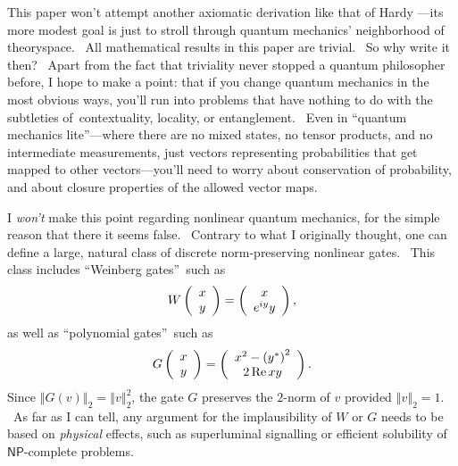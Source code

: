 \documentclass[12pt]{article}%
\begin{document}
This paper won't attempt another axiomatic derivation like that of
Hardy \cite{hardy}---its more modest goal is just to stroll through quantum
mechanics' neighborhood of theoryspace. \ All mathematical results in this
paper are trivial. \ So why write it then? \ Apart from the fact that
triviality never stopped a quantum philosopher before, I hope to make a point:
that if you change quantum mechanics in the most obvious ways, you'll run into
problems that have nothing to do with the subtleties of\ contextuality,
locality, or entanglement. \ Even in \textquotedblleft quantum mechanics
lite\textquotedblright---where there are no mixed states, no tensor products,
and no intermediate measurements, just vectors representing probabilities that
get mapped to other vectors---you'll need to worry about conservation of
probability, and about closure properties of the allowed vector maps.

I \textit{won't} make this point regarding nonlinear quantum mechanics, for
the simple reason that there it seems false. \ Contrary to what I originally
thought, one can define a large, natural class of discrete norm-preserving
nonlinear gates. \ This class includes \textquotedblleft Weinberg
gates\textquotedblright\ such as%
\[
W\left(
\begin{array}
[c]{c}%
x\\
y
\end{array}
\right)  =\left(
\begin{array}
[c]{c}%
x\\
e^{iy}y
\end{array}
\right)  ,
\]
as well as \textquotedblleft polynomial gates\textquotedblright\ such as%
\[
G\left(
\begin{array}
[c]{c}%
x\\
y
\end{array}
\right)  =\left(
\begin{array}
[c]{c}%
x^{2}-\left(  y^{\ast}\right)  ^{2}\\
2\operatorname{Re}xy
\end{array}
\right)  .
\]
Since $\left\Vert G\left(  v\right)  \right\Vert _{2}=\left\Vert v\right\Vert
_{2}^{2}$, the gate $G$ preserves the $2$-norm of $v$ provided $\left\Vert
v\right\Vert _{2}=1$. \ As far as I can tell, any argument for the
implausibility of $W$ or $G$ needs to be based on \textit{physical} effects,
such as superluminal signalling or efficient solubility of $\mathsf{NP}%
$-complete problems.
\end{document}
